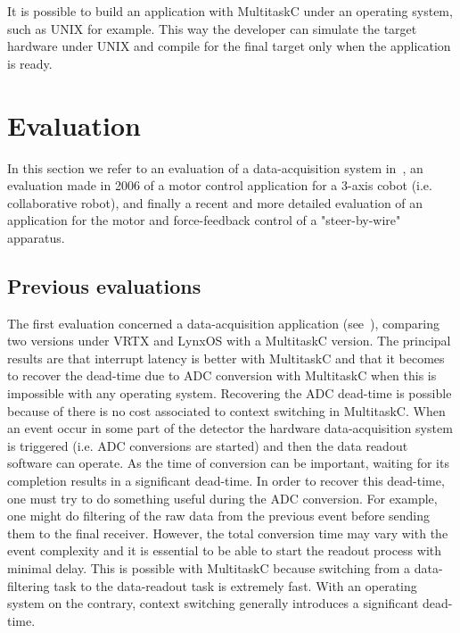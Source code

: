 \documentclass[10pt]{report}
\begin{document}
It is possible to build an application with MultitaskC under an operating system, such as UNIX for example. This way 
the developer can simulate the target hardware under UNIX and compile for the final target only when the application is ready.

\chapter{Evaluation}
\label{sec:evaluation}

In this section we refer to an evaluation of a data-acquisition system in~\cite{Delchini:95}, 
an evaluation made in 2006 of a motor control application for a 3-axis cobot (i.e. collaborative robot), and finally a 
recent and more detailed evaluation of an application for the motor and force-feedback control of a "steer-by-wire" apparatus.

\section{Previous evaluations}

The first evaluation concerned a data-acquisition application (see~\cite{Delchini:95}), comparing two versions under VRTX and LynxOS 
with a MultitaskC version. The principal results are that interrupt latency is better with MultitaskC and that it becomes 
to recover the dead-time due to ADC conversion with MultitaskC when this is impossible with any operating system. 
Recovering the ADC dead-time is possible because of there is no cost associated to context switching in MultitaskC. 
When an event occur in some part of the detector the hardware data-acquisition system is triggered (i.e. ADC conversions are
started) and then the data readout software can operate. As the time of conversion can be important, waiting for its completion 
results in a significant dead-time. In order to recover this dead-time, one must try to do something useful during the ADC 
conversion. For example, one might do filtering of the raw data from the previous event before sending them to the final receiver. 
However, the total conversion time may vary with the event complexity and it is essential to be able to start the readout process 
with minimal delay. This is possible with MultitaskC because switching from a data-filtering task to the data-readout task is 
extremely fast. With an operating system on the contrary, context switching generally introduces a significant dead-time.
\end{document}
